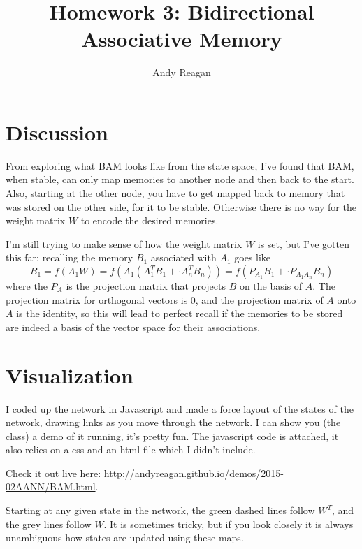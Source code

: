 \documentclass{article}
\begin{document}
\title{\vspace{-2cm}Homework 3: Bidirectional Associative Memory}
\author{Andy Reagan}

\maketitle

\section{Discussion}

From exploring what BAM looks like from the state space, I've found that BAM, when stable, can only map memories to another node and then back to the start.
Also, starting at the other node, you have to get mapped back to memory that was stored on the other side, for it to be stable.
Otherwise there is no way for the weight matrix $W$ to encode the desired memories.

I'm still trying to make sense of how the weight matrix $W$ is set, but I've gotten this far: recalling the memory $B_1$ associated with $A_1$ goes like
\[ B_1 = f(A_1 W) = f(A_1 (A_1^TB_1 + \cdot A_n^TB_n)) = f(P_{A_1} B_1 + \cdot P_{A_1A_n}B_n) \]
where the $P_A$ is the projection matrix that projects $B$ on the basis of $A$.
The projection matrix for orthogonal vectors is 0, and the projection matrix of $A$ onto $A$ is the identity, so this will lead to perfect recall if the memories to be stored are indeed a basis of the vector space for their associations.


\section{Visualization}

I coded up the network in Javascript and made a force layout of the states of the network, drawing links as you move through the network.
I can show you (the class) a demo of it running, it's pretty fun.
The javascript code is attached, it also relies on a css and an html file which I didn't include.

Check it out live here: \url{http://andyreagan.github.io/demos/2015-02AANN/BAM.html}.

Starting at any given state in the network, the green dashed lines follow $W^T$, and the grey lines follow $W$.
It is sometimes tricky, but if you look closely it is always unambiguous how states are updated using these maps.
\end{document}
